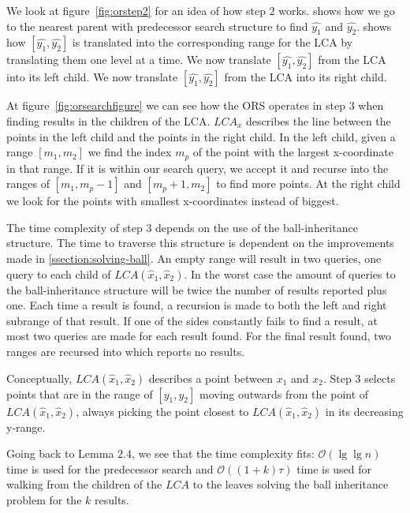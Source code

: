  We look at figure~\ref{fig:orstep2} for an idea of how step $2$ works.  shows how we go to the nearest parent with predecessor search structure to find $\hat{y_1}$ and $\hat{y_2}$.  shows how $[\hat{y_1}, \hat{y_2}]$ is translated into the corresponding range for the LCA by translating them one level at a time.  We now translate $[\hat{y_1}, \hat{y_2}]$ from the LCA into its left child.  We now translate $[\hat{y_1}, \hat{y_2}]$ from the LCA into its right child. 

 At figure~\ref{fig:orsearchfigure} we can see how the ORS operates in step $3$ when finding results in the children of the LCA. $LCA_x$ describes the line between the points in the left child and the points in the right child. In the left child, given a range $[m_1, m_2]$ we find the index $m_p$ of the point with the largest x-coordinate in that range. If it is within our search query, we accept it and recurse into the ranges of $[m_1, m_p -1]$ and $[m_p+1, m_2]$ to find more points. At the right child we look for the points with smallest x-coordinates instead of biggest.

The time complexity of step $3$ depends on the use of the ball-inheritance structure. The time to traverse this structure is dependent on the improvements made in \ref{ssection:solving-ball}. An empty range will result in two queries, one query to each child of $LCA(\hat{x}_1, \hat{x}_2)$. In the worst case the amount of queries to the ball-inheritance structure will be twice the number of results reported plus one. Each time a result is found, a recursion is made to both the left and right subrange of that result. If one of the sides constantly fails to find a result, at most two queries are made for each result found. For the final result found, two ranges are recursed into which reports no results.

Conceptually, $LCA(\hat{x}_1, \hat{x}_2)$ describes a point between $x_1$ and $x_2$. Step $3$ selects points that are in the range of $[y_1, y_2]$ moving outwards from the point of $LCA(\hat{x}_1, \hat{x}_2)$, always picking the point closest to $LCA(\hat{x}_1, \hat{x}_2)$ in its decreasing y-range. 

Going back to Lemma $2.4$, we see that the time complexity fits: $\mathcal{O}(\lg \lg n)$ time is used for the predecessor search and $\mathcal{O}((1+k)\tau)$ time is used for walking from the children of the $LCA$ to the leaves solving the ball inheritance problem for the $k$ results.


